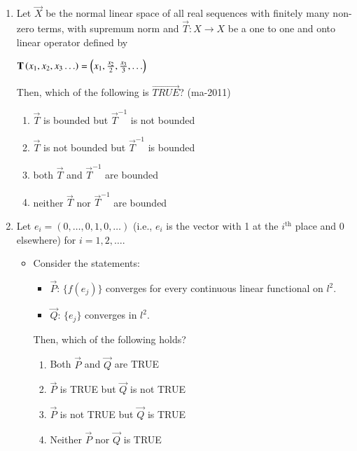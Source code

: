 \documentclass[journal,12pt,onecolumn]{IEEEtran}
\theoremstyle{remark}
\begin{document}
\begin{enumerate}
\begin{multicols}{4}
\begin{enumerate}
    \end{enumerate}
    \end{multicols}
    \item Let $\vec{X}$ be the normal linear space of all real sequences with finitely many non-zero terms, with supremum norm and $\vec{T} : X \rightarrow X$ be a one to one and onto linear operator defined by \\
    \begin{center}
    	$\mathbf{T} \left(x_1,x_2,x_3\ldots\right) = \left(x_1,\frac{x_2}{2}, \frac{x_3}{3},\ldots\right)$
    \end{center}
    Then, which of the following is $\vec{TRUE}$? 
    \hfill{(ma-2011)}
    \begin{multicols}{2}
    \begin{enumerate}
    \item $\vec{T}$ is bounded but $\vec{T}^{-1}$ is not bounded
    \item $\vec{T}$ is not bounded but $\vec{T}^{-1}$ is bounded
    \item both $\vec{T}$ and $\vec{T}^{-1}$ are bounded
    \item neither  $\vec{T}$ nor $\vec{T}^{-1}$ are bounded
    \end{enumerate}
    \end{multicols}
    \item Let $e_i = (0, \ldots, 0, 1, 0, \ldots)$ (i.e., $e_i$ is the vector with 1 at the $i^{\text{th}}$ place and 0 elsewhere) for $i = 1, 2, \ldots$.
    \begin{itemize}
    	\item[] Consider the statements:
    	\begin{itemize}
    		\item $\vec{P}$: $\{f(e_j)\}$ converges for every continuous linear functional on $l^2$.
    		\item $\vec{Q}$: $\{e_j\}$ converges in $l^2$.
    	\end{itemize}
    	Then, which of the following holds?
    	\begin{enumerate}
    		\item Both $\vec{P}$ and $\vec{Q}$ are TRUE
    		\item $\vec{P}$ is TRUE but $\vec{Q}$ is not TRUE
    		\item $\vec{P}$ is not TRUE but $\vec{Q}$ is TRUE
    		\item Neither $\vec{P}$ nor $\vec{Q}$ is TRUE
    	\end{enumerate}
    \end{itemize}
    

\end{enumerate}
\end{document}
